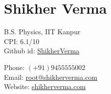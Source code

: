 \documentclass[a4paper]{article}
\author{Shikher Verma}
\begin{document}
\section*{\huge\textbf Shikher Verma}
\begin{minipage}{.45\linewidth}
	\begin{flushleft}
		B.S. Physics, IIT Kanpur\\
		CPI: 6.1/10\\
		Github id: \href{https://github.com/ShikherVerma}{ShikherVerma}\\
	\end{flushleft}
\end{minipage}
\hfill
\begin{minipage}{.45\linewidth}
	\begin{flushright}
		Phone: $(+91)9455555002$\\
		Email: \href{mailto:root@shikherverma.com}{root@shikherverma.com}\\
		Website: \href{http://shikherverma.com}{shikherverma.com}\\
	\end{flushright}
\end{minipage}

\end{document}
